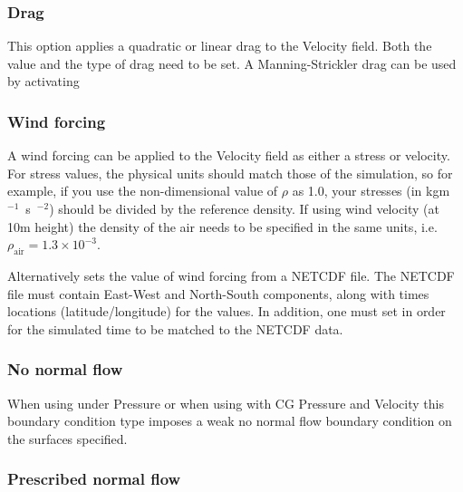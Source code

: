 \subsubsection{Drag}

This option applies a quadratic or linear drag to the Velocity field. Both the value and the type of drag need to be set. A Manning-Strickler drag can be used by activating 

\subsubsection{Wind forcing}\label{sec:wind_forcing}

A wind forcing can be applied to the Velocity field as either a stress or
velocity. For stress values, the physical units should match those of the
simulation, so for example, if you use the non-dimensional value of $\rho$
as 1.0, your stresses (in \unit{kgm\ensuremath{^{-1}}s\ensuremath{^{-2}}})
should be divided by the reference density.  If using wind velocity
(at 10m height) the density of the air needs to be specified in the same
units, i.e. $\rho_{\textrm{air}} = 1.3\times10^{-3}$.

Alternatively
sets the value of wind forcing from a NETCDF file. The NETCDF file must
contain East-West and North-South components, along with times locations
(latitude/longitude) for the values. In addition, one must set
 in order for the simulated
time to be matched to the NETCDF data.

\subsubsection{No normal flow}

When using  under Pressure  or when using
 with CG Pressure and Velocity this boundary condition type
imposes a weak no normal flow boundary condition on the surfaces specified.

\subsubsection{Prescribed normal flow}

